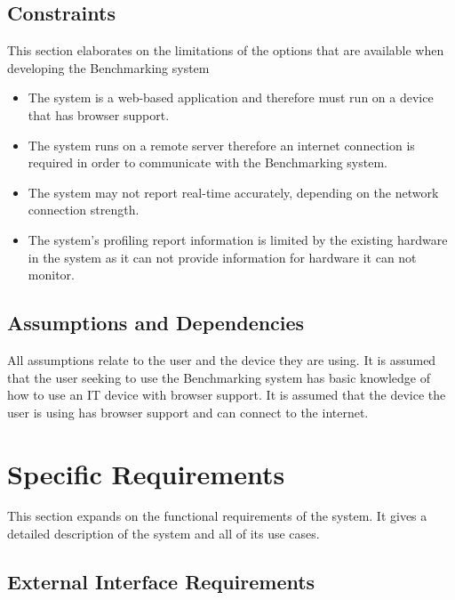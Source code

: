 \documentclass{article}
\begin{document}
	\subsection{Constraints}
    This section elaborates on the limitations of the options that are available when developing the Benchmarking system 
    \begin{itemize}
    	\item The system is a web-based application and therefore must run on a device that has browser support. 
        \item The system runs on a remote server therefore an internet connection is required in order to communicate with the Benchmarking system. 
        \item The system may not report real-time accurately, depending on the network connection strength.
        \item The system's profiling report information is limited by the existing hardware in the system as it can not provide information for hardware it can not monitor.
    \end{itemize}
	\subsection{Assumptions and Dependencies}
	All assumptions relate to the user and the device they are using. It is assumed that the user seeking to use the Benchmarking system has basic knowledge of how to use an IT device with browser support. It is assumed that the device the user is using has browser support and can connect to the internet.
    
	\section{Specific Requirements}
	This section expands on the functional requirements of the system. It gives a detailed 	description of the system and all of its use cases.
	
    \subsection{External Interface Requirements}
\end{document}
